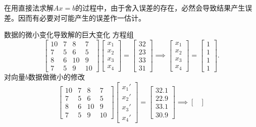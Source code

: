 在用直接法求解$Ax=b$的过程中，由于舍入误差的存在，必然会导致结果产生误差。因而有必要对可能产生的误差作一估计。
\begin{example}
    {数据的微小变化导致解的巨大变化}{}
    方程组
    \[
        \begin{bmatrix}
            10&7&8&7\\
            7&5&6&5\\
            8&6&10&9\\
            7&5&9&10
        \end{bmatrix}\begin{bmatrix}
            x_1\\x_2\\x_3\\x_4
        \end{bmatrix}=\begin{bmatrix}
            32\\23\\33\\31
        \end{bmatrix}\implies\begin{bmatrix}
            x_1\\x_2\\x_3\\x_4
        \end{bmatrix}=\begin{bmatrix}
            1\\1\\1\\1
        \end{bmatrix}.
    \]
    对向量$b$数据做微小的修改
    \[
        \begin{bmatrix}
            10&7&8&7\\
            7&5&6&5\\
            8&6&10&9\\
            7&5&9&10
        \end{bmatrix}\begin{bmatrix}
            x_1'\\x_2'\\x_3'\\x_4'
        \end{bmatrix}=\begin{bmatrix}
            32.1\\22.9\\33.1\\30.9
        \end{bmatrix}\implies\begin{bmatrix}

\end{bmatrix}\]
\end{example}
